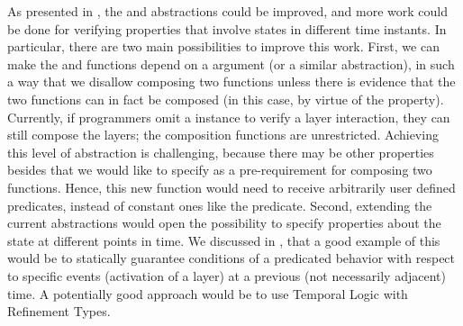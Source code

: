 As presented in , the  and  
abstractions could be improved, and more work could be done for verifying properties that involve 
states in different time instants. In particular, there are two main possibilities to improve this work.
First, we can make the  and  functions depend on a  
argument (or a similar abstraction), in such a way that we disallow composing two functions unless there 
is evidence that the two functions can in fact be composed (in this case, by virtue of the 
 property). Currently, if programmers omit a  instance to verify a 
layer interaction, they can still compose the layers; the composition functions are unrestricted. Achieving 
this level of abstraction is challenging, because there may be other properties besides 
 that we would like to specify as a pre-requirement for composing two functions.
Hence, this new  function would need to receive arbitrarily user defined predicates, 
instead of constant ones like the  predicate.
Second, extending the current abstractions would open the possibility to specify properties about the 
state at different points in time. We discussed in , that a good example of this would 
be to statically guarantee conditions of a predicated behavior with respect to specific events 
(\eg activation of a layer) at a previous (not necessarily adjacent) time.  A potentially good approach 
would be to use Temporal Logic with Refinement Types.


\endinput

